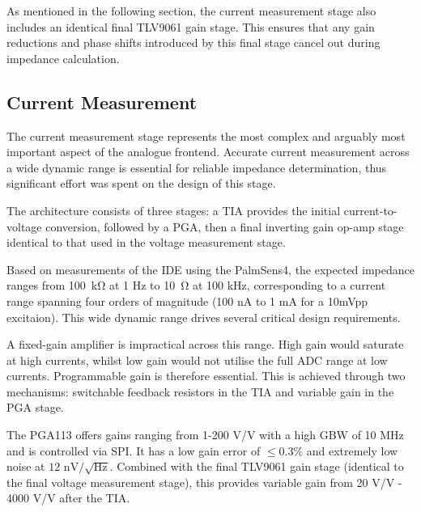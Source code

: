 As mentioned in the following section, the current measurement stage also includes an identical final TLV9061 gain stage. This ensures that any gain reductions and phase shifts introduced by this final stage cancel out during impedance calculation.

\subsection{Current Measurement}\label{subsec:design_cur}
The current measurement stage represents the most complex and arguably most important aspect of the analogue frontend. Accurate current measurement across a wide dynamic range is essential for reliable impedance determination, thus significant effort was spent on the design of this stage.

The architecture consists of three stages: a \ac{TIA} provides the initial current-to-voltage conversion, followed by a \ac{PGA}, then a final inverting gain op-amp stage identical to that used in the voltage measurement stage.

Based on measurements of the \ac{IDE} using the PalmSens4, the expected impedance ranges from \SI{100}{\kilo\ohm} at 1 Hz to \SI{10}{\ohm} at 100 kHz, corresponding to a current range spanning four orders of magnitude (100 nA to 1 mA for a 10mVpp excitaion). This wide dynamic range drives several critical design requirements.

A fixed-gain amplifier is impractical across this range. High gain would saturate at high currents, whilst low gain would not utilise the full \ac{ADC} range at low currents. Programmable gain is therefore essential. This is achieved through two mechanisms: switchable feedback resistors in the \ac{TIA} and variable gain in the \ac{PGA} stage.

The PGA113 offers gains ranging from 1-200 V/V with a high GBW of 10 MHz and is controlled via SPI. It has a low gain error of $\le0.3\%$ and extremely low noise at $12\text{ nV}/\sqrt{\text{Hz}}$. Combined with the final TLV9061 gain stage (identical to the final voltage measurement stage), this provides variable gain from 20 V/V - 4000 V/V after the \ac{TIA}. 


